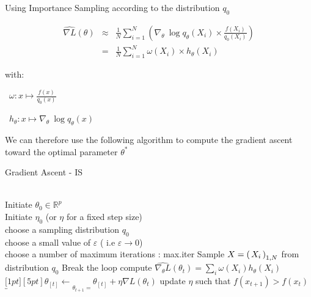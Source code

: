 Using Importance Sampling according to the distribution $q_0$

$$
\begin{array}{rcl}
\widehat{\nabla L}(\theta) 
&\approx& 
\frac 1 N \displaystyle\sum\limits_{i = 1}^N \left( \nabla_\theta \ \log q_\theta (X_i) \times \frac{f(X_i)}{q_0(X_i)}\right)
\\
&=& \frac 1 N \displaystyle\sum_{i = 1}^N \omega(X_i) \times h_\theta(X_i)
\end{array}
$$

with:

\faAngleRight \ $\omega : x \mapsto \frac{f(x)}{q_0(x)}$

\faAngleRight \ $h_\theta : x \mapsto \nabla_\theta \ \log q_\theta(x)$

We can therefore use the following algorithm to compute the gradient ascent toward the optimal parameter $\theta^*$

\begin{algorithm}[H]
\caption{Gradient Ascent - IS}\label{alg:gaIS}
\begin{algorithmic}
    \Require 
    \\ \ra Initiate $\theta_0 \in \mathbb R^p$ 
    \\ \ra Initiate $\eta_0$ (or $\eta$ for a fixed step size) 
    \\ \ra choose a sampling distribution $q_0$
    \\ \ra choose a small value of $\varepsilon$ ( i.e $\varepsilon \rightarrow 0 $)
    \\ \ra choose a number of maximum iterations : max.iter
    \State Sample $X = \left( \, {X} _ {i} \, \right)_{1, N}$ from distribution $q_0$ 
            \State Break the loop
        \EndIf
        \State \ra compute $\widehat{\nabla_\theta L}(\theta_t) = \displaystyle\sum\limits_i\omega(X_i) h_\theta(X_i)$
        \State \ra $\underbracket[1pt][5pt]{\theta_{[t]} \gets}_{\theta_{t+1} = } \theta_{[t]} + \eta \nabla L(\theta_t)$
        \State \ra update $\eta$ such that $f(x_{t+1}) > f(x_t)$ 
    \EndFor  
\end{algorithmic}
\end{algorithm}

